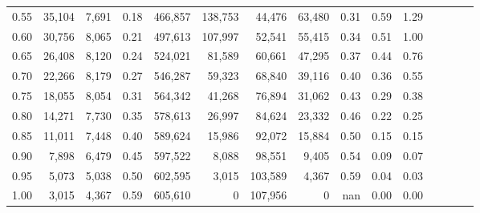 \begin{tabular}{rrrcrrrrrrrrrrr}
0.55 &  35,104 &  7,691 &                                       0.18 &  466,857 &  138,753 &   44,476 &   63,480 &  0.31 &  0.59 &                         1.29 \\
0.60 &  30,756 &  8,065 &                                       0.21 &  497,613 &  107,997 &   52,541 &   55,415 &  0.34 &  0.51 &                         1.00 \\
0.65 &  26,408 &  8,120 &                                       0.24 &  524,021 &   81,589 &   60,661 &   47,295 &  0.37 &  0.44 &                         0.76 \\
0.70 &  22,266 &  8,179 &                                       0.27 &  546,287 &   59,323 &   68,840 &   39,116 &  0.40 &  0.36 &                         0.55 \\
0.75 &  18,055 &  8,054 &                                       0.31 &  564,342 &   41,268 &   76,894 &   31,062 &  0.43 &  0.29 &                         0.38 \\
0.80 &  14,271 &  7,730 &                                       0.35 &  578,613 &   26,997 &   84,624 &   23,332 &  0.46 &  0.22 &                         0.25 \\
0.85 &  11,011 &  7,448 &                                       0.40 &  589,624 &   15,986 &   92,072 &   15,884 &  0.50 &  0.15 &                         0.15 \\
0.90 &   7,898 &  6,479 &                                       0.45 &  597,522 &    8,088 &   98,551 &    9,405 &  0.54 &  0.09 &                         0.07 \\
0.95 &   5,073 &  5,038 &                                       0.50 &  602,595 &    3,015 &  103,589 &    4,367 &  0.59 &  0.04 &                         0.03 \\
1.00 &   3,015 &  4,367 &                                       0.59 &  605,610 &        0 &  107,956 &        0 &   nan &  0.00 &                         0.00 \\
\bottomrule
\end{tabular}
